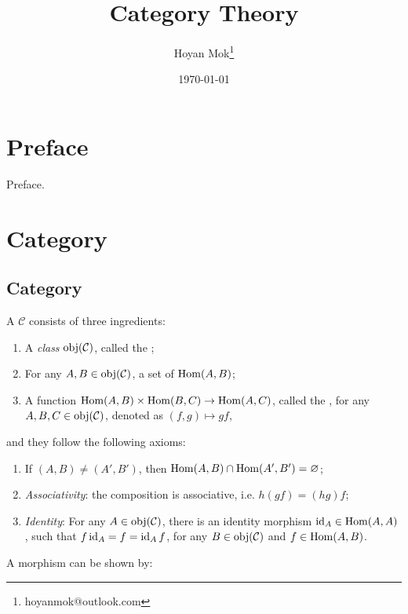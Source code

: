 \documentclass[openany, a5paper]{book}
\title{Category Theory}
\author{%
	Hoyan Mok\thanks{%
		hoyanmok@outlook.com
	}
}
\date{\today} %
\begin{document}
\maketitle %
\frontmatter
\chapter{Preface}
Preface.

\tableofcontents

\mainmatter
\chapter{Category}
\section{Category}

\begin{definition}[Category]
	A  $\mathcal C$ consists of three ingredients:
	\begin{enumerate}
		\item A \emph{class} $\operatorname{obj}(\mathcal C)$, called the ;
		\item For any $A, B \in \operatorname{obj}(\mathcal C)$, a set of  $\operatorname{Hom}(A, B)$;
		\item A function $\operatorname{Hom}(A, B) \times \operatorname{Hom}(B, C) \to \operatorname{Hom}(A, C)$, called the , for any $A, B, C \in \operatorname{obj}(\mathcal C)$, denoted as $(f, g) \mapsto gf$, 
	\end{enumerate}
	and they follow the following axioms:
	\begin{enumerate}[label=(\roman*)]
		\item If $(A, B) \neq (A', B')$, then $\operatorname{Hom}(A, B) \cap \operatorname{Hom}(A', B') = \varnothing$;
		\item \emph{Associativity}: the composition is associative, i.e. $h(gf) = (hg)f$;
		\item \emph{Identity}: For any $A \in \operatorname{obj}(\mathcal C)$, there is an identity morphism $\operatorname{id}_A \in \operatorname{Hom}(A, A)$, such that $f \operatorname{id}_A = f = \operatorname{id}_A f$, for any $B \in \operatorname{obj}(\mathcal C)$ and $f \in \operatorname{Hom}(A, B)$.
	\end{enumerate}
\end{definition}

A morphism can be shown by:
\end{document}
